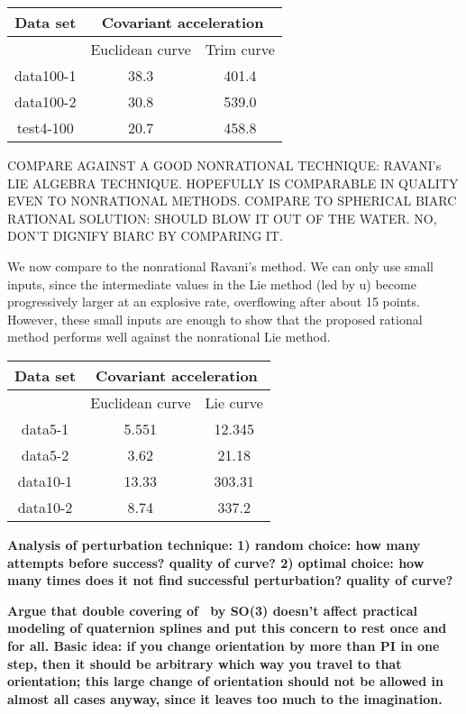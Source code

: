 \begin{table}
\label{tab:cov2}
\begin{tabular}{|c|c|c|}  	\hline
Data set & \multicolumn{2}{c|}{Covariant acceleration} \\ \hline
	 & Euclidean curve  & Trim curve \\ \hline
data100-1 & 38.3 & 401.4 \\ \hline
data100-2 & 30.8 & 539.0 \\ \hline
test4-100 & 20.7 & 458.8 \\ \hline
\end{tabular}
\end{table}

COMPARE AGAINST A GOOD NONRATIONAL TECHNIQUE: RAVANI's LIE ALGEBRA
TECHNIQUE.
HOPEFULLY IS COMPARABLE IN QUALITY EVEN TO NONRATIONAL METHODS.
COMPARE TO SPHERICAL BIARC RATIONAL SOLUTION: SHOULD BLOW IT OUT
OF THE WATER.  NO, DON'T DIGNIFY BIARC BY COMPARING IT.

We now compare to the nonrational Ravani's method.
We can only use small inputs, since the intermediate values in the
Lie method (led by u) become progressively larger at an explosive rate,
overflowing after about 15 points.
However, these small inputs are enough to show that the proposed
rational method performs well against the nonrational Lie method.


\begin{table}
\label{tab:cov3}
\begin{tabular}{|c|c|c|}  	\hline
Data set & \multicolumn{2}{c|}{Covariant acceleration} \\ \hline
	 & Euclidean curve & Lie curve \\ \hline
data5-1 & 5.551 & 12.345 \\ \hline
data5-2 & 3.62  & 21.18 \\ \hline
data10-1 & 13.33 & 303.31 \\ \hline
data10-2 & 8.74 & 337.2 \\ \hline
\end{tabular}
\end{table}

{\bf Analysis of perturbation technique: 
1) random choice: how many attempts before success?  quality of curve?
2) optimal choice: how many times does it not find successful perturbation? 
quality of curve?}

{\bf Argue that double covering of \ by SO(3) doesn't affect
practical modeling of quaternion splines and put this concern to rest
once and for all.  Basic idea: if you change orientation by more than PI
in one step, then it should be arbitrary which way you travel to that
orientation; this large change of orientation should not be allowed
in almost all cases anyway, since it leaves too much to the imagination.} 

